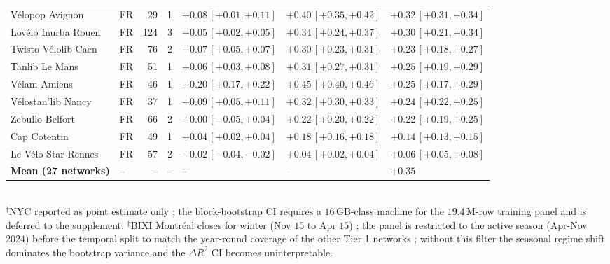\documentclass[11pt,a4paper]{article}
\begin{document}
\begin{table}[H]
\begin{tabular}{@{}llrrlll@{}}
V\'elopop Avignon           & FR &    29 &      1 & $+0.08\,[+0.01,+0.11]$  & $+0.40\,[+0.35,+0.42]$ & $+0.32\,[+0.31,+0.34]$ \\
Lov\'elo Inurba Rouen       & FR &   124 &      3 & $+0.05\,[+0.02,+0.05]$  & $+0.34\,[+0.24,+0.37]$ & $+0.30\,[+0.21,+0.34]$ \\
Twisto V\'elolib Caen       & FR &    76 &      2 & $+0.07\,[+0.05,+0.07]$  & $+0.30\,[+0.23,+0.31]$ & $+0.23\,[+0.18,+0.27]$ \\
Tanlib Le Mans              & FR &    51 &      1 & $+0.06\,[+0.03,+0.08]$  & $+0.31\,[+0.27,+0.31]$ & $+0.25\,[+0.19,+0.29]$ \\
V\'elam Amiens              & FR &    46 &      1 & $+0.20\,[+0.17,+0.22]$  & $+0.45\,[+0.40,+0.46]$ & $+0.25\,[+0.17,+0.29]$ \\
V\'elostan'lib Nancy        & FR &    37 &      1 & $+0.09\,[+0.05,+0.11]$  & $+0.32\,[+0.30,+0.33]$ & $+0.24\,[+0.22,+0.25]$ \\
Zebullo Belfort             & FR &    66 &      2 & $+0.00\,[-0.05,+0.04]$  & $+0.22\,[+0.20,+0.22]$ & $+0.22\,[+0.19,+0.25]$ \\
Cap Cotentin                & FR &    49 &      1 & $+0.04\,[+0.02,+0.04]$  & $+0.18\,[+0.16,+0.18]$ & $+0.14\,[+0.13,+0.15]$ \\
Le V\'elo Star Rennes       & FR &    57 &      2 & $-0.02\,[-0.04,-0.02]$  & $+0.04\,[+0.02,+0.04]$ & $+0.06\,[+0.05,+0.08]$ \\
\midrule
\textbf{Mean (27 networks)} & --  & --   & --   & --                     & --                    & $+0.35$ \\
\bottomrule
\end{tabular}
\smallskip\\
{\footnotesize $^{\dagger}$NYC reported as point estimate only ; the
block-bootstrap CI requires a $16$\,GB-class machine for the
$19.4$\,M-row training panel and is deferred to the supplement.
$^{\ddagger}$BIXI Montr\'eal closes for winter (Nov $15$ to Apr $15$) ;
the panel is restricted to the active season (Apr-Nov $2024$) before
the temporal split to match the year-round coverage of the other
Tier 1 networks ; without this filter the seasonal regime shift
dominates the bootstrap variance and the $\Delta R^2$ CI becomes
uninterpretable.}
\end{table}
\end{document}
